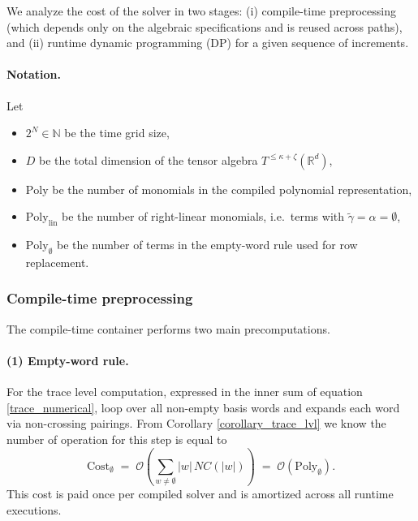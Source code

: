 \documentclass{article}%
\begin{document}
We analyze the cost of the solver in two stages: (i) compile-time preprocessing
(which depends only on the algebraic specifications and is reused across paths),
and (ii) runtime dynamic programming (DP) for a given sequence of increments.

\paragraph{Notation.}
Let
\begin{itemize}
  \item $2^N \in \mathbb{N}$ be the time grid size,
  \item $D$ be the total dimension of the tensor algebra $T^{\leq \kappa + \zeta}(\mathbb{R}^d)$,
  \item $\mathrm{Poly}$ be the number of monomials in the compiled polynomial representation,
  \item $\mathrm{Poly}_{\mathrm{lin}}$ be the number of right-linear monomials, i.e.\ terms with $\tilde{\gamma} = \alpha =\emptyset$,
  \item $\mathrm{Poly}_{\emptyset}$ be the number of terms in the empty-word rule used for row replacement.
\end{itemize}

\subsubsection{Compile-time preprocessing}

The compile-time container performs two main precomputations.

\paragraph{(1) Empty-word rule.}
For the trace level computation, expressed in the inner sum of equation \eqref{trace_numerical}, loop over all non-empty basis words and expands each word via
non-crossing pairings. From Corollary \ref{corollary_trace_lvl} we know the number of operation for this step is equal to
\begin{equation}
  \label{eq:empty-rule-cost}
  \mathrm{Cost}_{\emptyset}
  \; = \;\mathcal{O}\left(
    \sum_{w \neq \emptyset} |w| \, NC(|w|)\right)
  \;=\; \mathcal{O} \left(
  \mathrm{Poly}_{\emptyset}\right).
\end{equation}
This cost is paid once per compiled solver and is amortized across all runtime executions.
\end{document}
